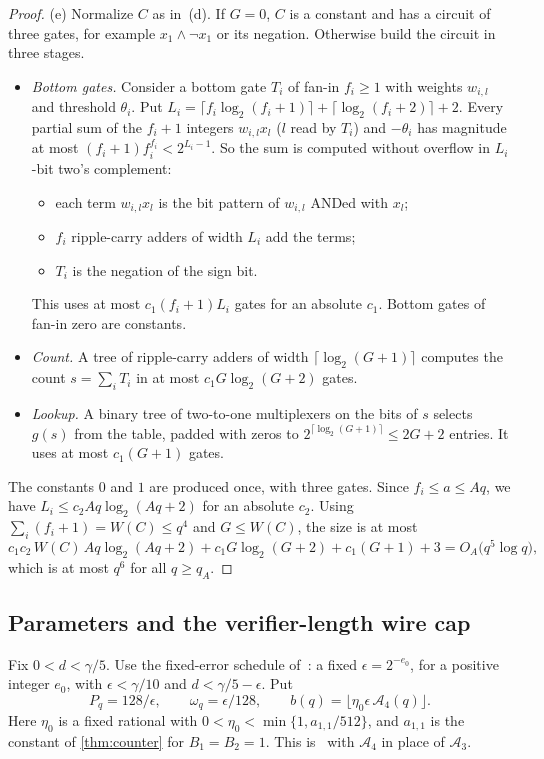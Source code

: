 \documentclass[11pt,letterpaper]{article}
\theoremstyle{definition}
\theoremstyle{remark}
\newcommand{\lgx}{\log_2}
\begin{document}
\begin{proof}
(e) Normalize \(C\) as in~(d). If \(G=0\), \(C\) is a constant and
has a circuit of three gates, for example \(x_1\wedge\neg x_1\) or its
negation. Otherwise build the circuit in three stages.
\begin{itemize}
\item \emph{Bottom gates.} Consider a bottom gate \(T_i\) of fan-in
\(f_i\ge1\) with weights \(w_{i,l}\) and threshold \(\theta_i\). Put
\(L_i=\lceil f_i\lgx(f_i+1)\rceil+\lceil\lgx(f_i+2)\rceil+2\). Every
partial sum of the \(f_i+1\) integers \(w_{i,l}x_l\) (\(l\) read by
\(T_i\)) and \(-\theta_i\) has magnitude at most
\((f_i+1)f_i^{f_i}<2^{L_i-1}\). So the sum is computed without
overflow in \(L_i\)-bit two's complement:
\begin{itemize}
\item each term \(w_{i,l}x_l\) is the bit pattern of \(w_{i,l}\)
ANDed with \(x_l\);
\item \(f_i\) ripple-carry adders of width \(L_i\) add the terms;
\item \(T_i\) is the negation of the sign bit.
\end{itemize}
This uses at most \(c_1(f_i+1)L_i\) gates for an absolute \(c_1\).
Bottom gates of fan-in zero are constants.
\item \emph{Count.} A tree of ripple-carry adders of width
\(\lceil\lgx(G+1)\rceil\) computes the count \(s=\sum_iT_i\) in at most
\(c_1G\lgx(G+2)\) gates.
\item \emph{Lookup.} A binary tree of two-to-one multiplexers on the
bits of \(s\) selects \(g(s)\) from the table, padded with zeros to
\(2^{\lceil\lgx(G+1)\rceil}\le2G+2\) entries. It uses at most
\(c_1(G+1)\) gates.
\end{itemize}
The constants \(0\) and \(1\) are produced once, with three gates.
Since \(f_i\le a\le Aq\), we have \(L_i\le c_2Aq\lgx(Aq+2)\) for an
absolute \(c_2\). Using \(\sum_i(f_i+1)=W(C)\le q^4\) and \(G\le W(C)\),
the size is at most
\[
 c_1c_2\,W(C)\,Aq\lgx(Aq+2)+c_1G\lgx(G+2)+c_1(G+1)+3
 =O_A\bigl(q^5\log q\bigr),
\]
which is at most \(q^6\) for all \(q\ge q_A\).
\end{proof}

\subsection{Parameters and the verifier-length wire cap}\label{sec:ae-params}

Fix \(0<d<\gamma/5\). Use the fixed-error schedule
of~\cite[Section~11.4]{NagCG}: a fixed \(\epsilon=2^{-e_0}\), for a
positive integer \(e_0\), with \(\epsilon<\gamma/10\) and
\(d<\gamma/5-\epsilon\). Put
\[
 P_q=128/\epsilon,\qquad\omega_q=\epsilon/128,\qquad
 b(q)=\bigl\lfloor\eta_0\epsilon\,\mathcal A_4(q)\bigr\rfloor .
\]
Here \(\eta_0\) is a fixed rational with \(0<\eta_0<\min\{1,a_{1,1}/512\}\), and
\(a_{1,1}\) is the constant of \cref{thm:counter} for \(B_1=B_2=1\).
This is~\cite[Equation~(14)]{NagCG} with \(\mathcal A_4\) in place of
\(\mathcal A_3\).
\end{document}
